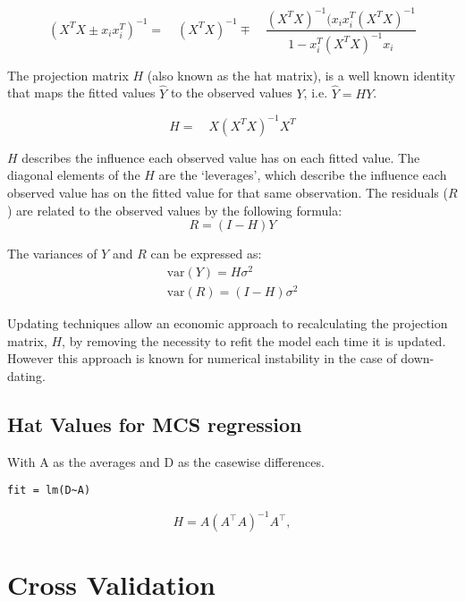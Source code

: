 \documentclass[12pt, a4paper]{report}
\theoremstyle{plain}
\theoremstyle{definition}
\theoremstyle{remark}
\begin{document}
\begin{equation}
(X^{T}X \pm x_{i}x_{i}^{T})^{-1} = \quad(X^{T}X )^{-1} \mp \quad
\frac{(X^{T}X)^{-1}(x_{i}x_{i}^{T}(X^{T}X)^{-1}}{1-x_{i}^{T}(X^{T}X)^{-1}x_{i}}
\end{equation}

The projection matrix $H$ (also known as the hat matrix), is a
well known identity that maps the fitted values $\hat{Y}$ to the
observed values $Y$, i.e. $\hat{Y} = HY$.

\begin{equation}
H =\quad X(X^{T}X)^{-1}X^{T}
\end{equation}

$H$ describes the influence each observed value has on each fitted value. The diagonal elements of the $H$ are the `leverages', which describe the influence each observed value has on the fitted value for that same observation. The residuals ($R$) are related to the observed values by the following formula:
\begin{equation}
R = (I-H)Y
\end{equation}

The variances of $Y$ and $R$ can be expressed as:
\begin{eqnarray}
\mbox{var}(Y) = H\sigma^{2} \nonumber\\
\mbox{var}(R) = (I-H)\sigma^{2}
\end{eqnarray}

Updating techniques allow an economic approach to recalculating the projection matrix, $H$, by removing the necessity to refit the model each time it is updated. However this approach is known for
numerical instability in the case of down-dating.



\subsection{Hat Values for MCS regression}

With A as the averages and D as the casewise differences.
\begin{verbatim}
fit = lm(D~A)
\end{verbatim}

\begin{displaymath}
H = A \left(A^\top  A\right)^{-1} A^\top ,
\end{displaymath}

\newpage
\section{Cross Validation} %
\end{document}
